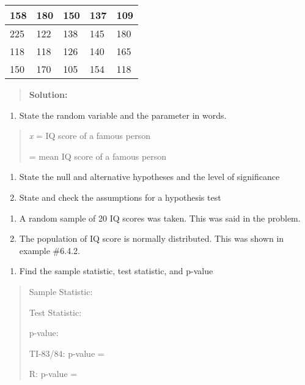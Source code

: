 \documentclass[]{book}
\providecommand{\tightlist}{%
  \setlength{\itemsep}{0pt}\setlength{\parskip}{0pt}}
\begin{document}
\begin{longtable}[]{@{}lllll@{}}
\toprule
158 & 180 & 150 & 137 & 109\tabularnewline
\midrule
\endhead
225 & 122 & 138 & 145 & 180\tabularnewline
118 & 118 & 126 & 140 & 165\tabularnewline
150 & 170 & 105 & 154 & 118\tabularnewline
\bottomrule
\end{longtable}

\begin{quote}
\textbf{Solution:}
\end{quote}

\begin{enumerate}
\def\labelenumi{\arabic{enumi}.}
\tightlist
\item
  State the random variable and the parameter in words.
\end{enumerate}

\begin{quote}
\emph{x} = IQ score of a famous person

= mean IQ score of a famous person
\end{quote}

\begin{enumerate}
\def\labelenumi{\arabic{enumi}.}
\setcounter{enumi}{1}
\item
  State the null and alternative hypotheses and the level of
  significance
\item
  State and check the assumptions for a hypothesis test
\end{enumerate}

\begin{enumerate}
\def\labelenumi{\alph{enumi}.}
\item
  A random sample of 20 IQ scores was taken. This was said in the
  problem.
\item
  The population of IQ score is normally distributed. This was shown
  in example \#6.4.2.
\end{enumerate}

\begin{enumerate}
\def\labelenumi{\arabic{enumi}.}
\setcounter{enumi}{3}
\tightlist
\item
  Find the sample statistic, test statistic, and p-value
\end{enumerate}

\begin{quote}
Sample Statistic:

Test Statistic:

p-value:

TI-83/84: p-value =

R: p-value =
\end{quote}
\end{document}
